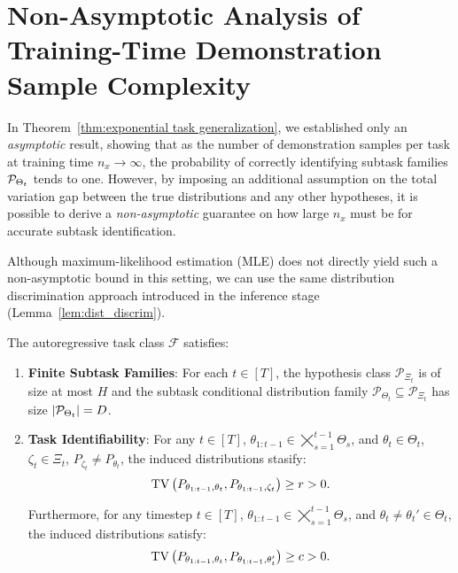 \section{Non-Asymptotic Analysis of Training-Time Demonstration Sample Complexity}
\label{appendix:nonasymp-result}

In Theorem~\ref{thm:exponential task generalization}, we established only an \emph{asymptotic} result, showing that as {the number of demonstration samples per task at training time }$n_x \to \infty$, the probability of correctly identifying subtask families ${\mathcal{P}}_{\Theta_t}$  tends to one. However, by imposing an additional assumption on the total variation gap between the true distributions and any other hypotheses, it is possible to derive a \emph{non-asymptotic} guarantee on how large $n_x$ must be for accurate subtask identification.

Although maximum-likelihood estimation (MLE) does not directly yield such a non-asymptotic bound in this setting, we can use the same distribution discrimination approach introduced in the inference stage (Lemma~\ref{lem:dist_discrim}). 


\begin{assumption}\label{assm: compositional structure with gap}
The autoregressive task class $\mathcal{F}$ satisfies:
\begin{enumerate}
    \item \textbf{Finite Subtask Families}: For each $t \in [T]$, the hypothesis class $\mathcal{P}_{\Xi_t}$ is of size at most $H$ and the subtask conditional distribution family $\mathcal{P}_{\Theta_t} \subseteq \mathcal{P}_{\Xi_t}$ has size $|\mathcal{P}_{\Theta_t}| = D$.

    \item \textbf{Task Identifiability}: For any $t \in [T]$,  $\theta_{1:t-1} \in \bigtimes_{s=1}^{t-1} \Theta_s$, and  $\theta_t \in \Theta_t$, $\zeta_t \in \Xi_t $, $P_{\zeta_t}\neq P_{\theta_t}$, the induced distributions stasify:
    \[
    {\mathrm{TV}}\left(P_{\theta_{1:t-1}, \theta_t}, P_{\theta_{1:t-1}, \zeta_t}\right) \geq r > 0.
    \]
    
    Furthermore, for any timestep $t \in [T]$,  $\theta_{1:t-1} \in \bigtimes_{s=1}^{t-1} \Theta_s$, and $\theta_t \neq \theta_t' \in \Theta_t$, the induced distributions satisfy:
    \[
    {\mathrm{TV}}\left(P_{\theta_{1:t-1},\theta_t}, P_{\theta_{1:t-1},\theta_t'}\right) \geq c > 0.
    \]

\end{enumerate}
\end{assumption}

